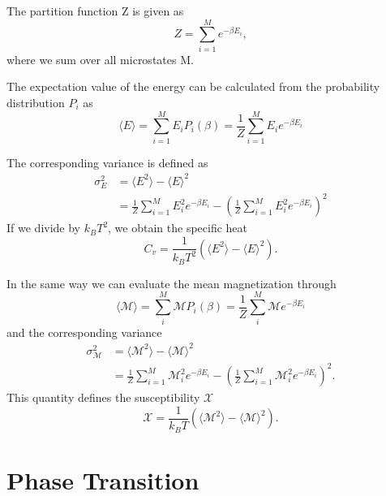\documentclass[%
reprint,
nofootinbib,
amsmath,amssymb,
aps,
]{revtex4-1}
\begin{document}
The partition function Z is given as 
\begin{equation}\label{eq:Z}
	Z = \sum_{i=1}^{M}e^{-\beta E_i},
\end{equation} 
where we sum over all microstates M.

The expectation value of the energy can be calculated from the probability distribution $P_i$ as 
\begin{equation}\label{eq:E}
	\langle E\rangle = \sum_{i=1}^{M}E_iP_i(\beta) = \frac{1}{Z}\sum_{i=1}^ME_ie^{-\beta E_i}
\end{equation}

The corresponding variance is defined as 
\begin{equation}
	\begin{split}
\sigma_E^2 &= \langle E^2 \rangle -\langle E\rangle^2 \\
&= \frac{1}{Z}\sum_{i=1}^ME_i^2e^{-\beta E_i} - \left(\frac{1}{Z}\sum_{i=1}^ME_i^2e^{-\beta E_i}\right)^2
	\end{split}
\end{equation}
If we divide by $k_BT^2$, we obtain the specific heat 
\begin{equation}\label{eq:cv}
	C_v = \frac{1}{k_BT^2}\left(\langle E^2 \rangle -\langle E\rangle^2\right).
\end{equation}

In the same way we can evaluate the mean magnetization through 
\begin{equation}\label{eq:M}
	\langle\mathcal{M}\rangle = \sum_i^M\mathcal{M}P_i(\beta) = \frac{1}{Z}\sum_i^M\mathcal{M}e^{-\beta E_i}
\end{equation}
and the corresponding variance 
\begin{equation}
\begin{split} 
		\sigma_\mathcal{M}^2			&=\langle \mathcal{M}^2 \rangle -\langle \mathcal{M}\rangle^2 \\
			&= \frac{1}{Z}\sum_{i=1}^M\mathcal{M}_i^2e^{-\beta E_i} - \left(\frac{1}{Z}\sum_{i=1}^M\mathcal{M}_i^2e^{-\beta E_i}\right)^2.
		\end{split} 
\end{equation}
This quantity defines the susceptibility $\mathcal{X}$
\begin{equation}\label{eq:x}
	\mathcal{X} = \frac{1}{k_BT}\left(\langle \mathcal{M}^2 \rangle -\langle \mathcal{M}\rangle^2\right).
\end{equation}
\section{Phase Transition}
\end{document}
